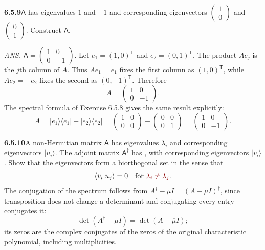 \par\bigskip
\noindent\textbf{6.5.9}\quad $\mathsf{A}$ has eigenvalues $1$ and $-1$ and
corresponding eigenvectors $\begin{pmatrix}1\\0\end{pmatrix}$ and
$\begin{pmatrix}0\\1\end{pmatrix}$. Construct $\mathsf{A}$.
\par\nobreak\hfill\emph{ANS.}\enspace
$\mathsf{A}=\begin{pmatrix}1&0\\0&-1\end{pmatrix}$.
\solution
Let $e_1=(1,0)^{\mathsf T}$ and $e_2=(0,1)^{\mathsf T}$.
The product $Ae_j$ is the $j$th column of $A$. Thus $Ae_1=e_1$ fixes
the first column as $(1,0)^{\mathsf T}$, while $Ae_2=-e_2$ fixes the
second as $(0,-1)^{\mathsf T}$. Therefore
\[
\boxed{A=\begin{pmatrix}1&0\\0&-1\end{pmatrix}.}
\]
The spectral formula of Exercise 6.5.8 gives the same result
explicitly:
\[
A=|e_1\rangle\langle e_1|-|e_2\rangle\langle e_2|
=\begin{pmatrix}1&0\\0&0\end{pmatrix}
 -\begin{pmatrix}0&0\\0&1\end{pmatrix}
=\begin{pmatrix}1&0\\0&-1\end{pmatrix}.
\]

\par\bigskip
\noindent\textbf{6.5.10}\quad A non-Hermitian matrix $\mathsf{A}$ has
eigenvalues $\lambda_{i}$ and corresponding eigenvectors $|u_{i}\rangle$. The
adjoint matrix $\mathsf{A}^{\dagger}$ has , with corresponding eigenvectors $|v_{i}\rangle$. Show that the
eigenvectors form a biorthogonal set in the sense that
\[
\langle v_{i}|u_{j}\rangle=0\quad\text{for }\erratum{\lambda_{i}\neq\lambda_{j}}.
\]
\solution
{}
The conjugation of the spectrum follows from
$A^\dagger-\mu I=(A-\overline\mu I)^\dagger$, since transposition does
not change a determinant and conjugating every entry conjugates it:
\[
\det(A^\dagger-\mu I)
=\overline{\det(A-\overline\mu I)};
\]
its zeros are the complex conjugates of the zeros of the original
characteristic polynomial, including multiplicities.

